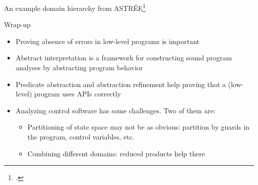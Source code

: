 \documentclass[aspectratio=169]{beamer}
\begin{document}
\begin{frame}{An example domain hierarchy from ASTRÉE\footcite{cousot2006combination}}
  \begingroup\tiny
  \begin{center}
  \end{center}
  \endgroup
\end{frame}

\begin{frame}{Wrap-up}
  \begin{itemize}[<+->]
  \item Proving absence of errors in low-level programs is important
  \item Abstract interpretation is a framework for constructing sound program analyses by abstracting program behavior
  \item Predicate abstraction and abstraction refinement help proving that a (low-level) program uses APIs correctly
  \item Analyzing control software has some challenges. Two of them are:
    \begin{itemize}
    \item Partitioning of state space may not be as obvious: partition by guards in the program, control variables, etc.
    \item Combining different domains: reduced products help there
    \end{itemize}
  \end{itemize}
\end{frame}
\end{document}
